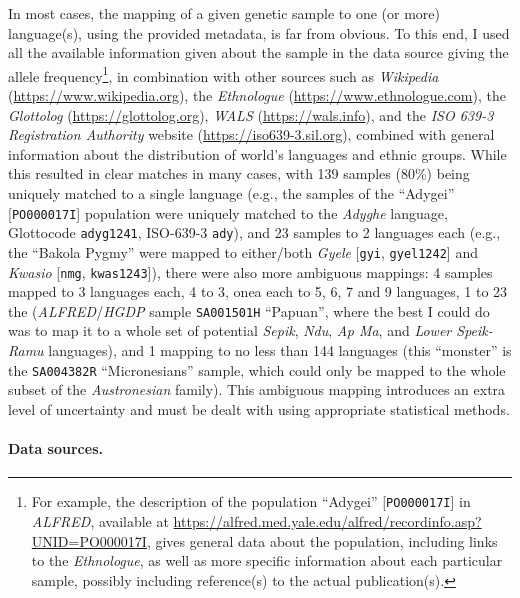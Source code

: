 \documentclass[twoside,onecolumn]{article}
\begin{document}
In most cases, the mapping of a given genetic sample to one (or more) language(s), using the provided metadata, is far from obvious.
To this end, I used all the available information given about the sample in the data source giving the allele frequency\footnote{For example, the description of the population ``Adygei'' [\texttt{PO000017I}] in \textit{ALFRED}, available at \url{https://alfred.med.yale.edu/alfred/recordinfo.asp?UNID=PO000017I}, gives general data about the population, including links to the \textit{Ethnologue}, as well as more specific information about each particular sample, possibly including reference(s) to the actual publication(s).}, in combination with other sources such as \textit{Wikipedia} (\url{https://www.wikipedia.org}), the \textit{Ethnologue} (\url{https://www.ethnologue.com}), the \textit{Glottolog} (\url{https://glottolog.org}), \textit{WALS} (\url{https://wals.info}), and the \textit{ISO 639-3 Registration Authority} website (\url{https://iso639-3.sil.org}), combined with general information about the distribution of world's languages and ethnic groups.
While this resulted in clear matches in many cases, with 139 samples (80\%) being uniquely matched to a single language (e.g., the samples of the ``Adygei'' [\texttt{PO000017I}] population were uniquely matched to the \textit{Adyghe} language, Glottocode \texttt{adyg1241}, ISO-639-3 \texttt{ady}), and 23 samples to 2 languages each (e.g., the ``Bakola Pygmy'' were mapped to either/both \textit{Gyele} [\texttt{gyi}, \texttt{gyel1242}] and \textit{Kwasio} [\texttt{nmg}, \texttt{kwas1243}]), there were also more ambiguous mappings: 4 samples mapped to 3 languages each, 4 to 3, onea each to 5, 6, 7 and 9 languages, 1 to 23 the (\textit{ALFRED}/\textit{HGDP} sample \texttt{SA001501H} ``Papuan'', where the best I could do was to map it to a whole set of potential \textit{Sepik}, \textit{Ndu}, \textit{Ap Ma}, and\textit{ Lower Speik-Ramu} languages), and 1 mapping to no less than 144 languages (this ``monster'' is the \texttt{SA004382R} ``Micronesians'' sample, which could only be mapped to the whole subset of the \textit{Austronesian} family).
This ambiguous mapping introduces an extra level of uncertainty and must be dealt with using appropriate statistical methods.

\paragraph{Data sources.}
\end{document}
